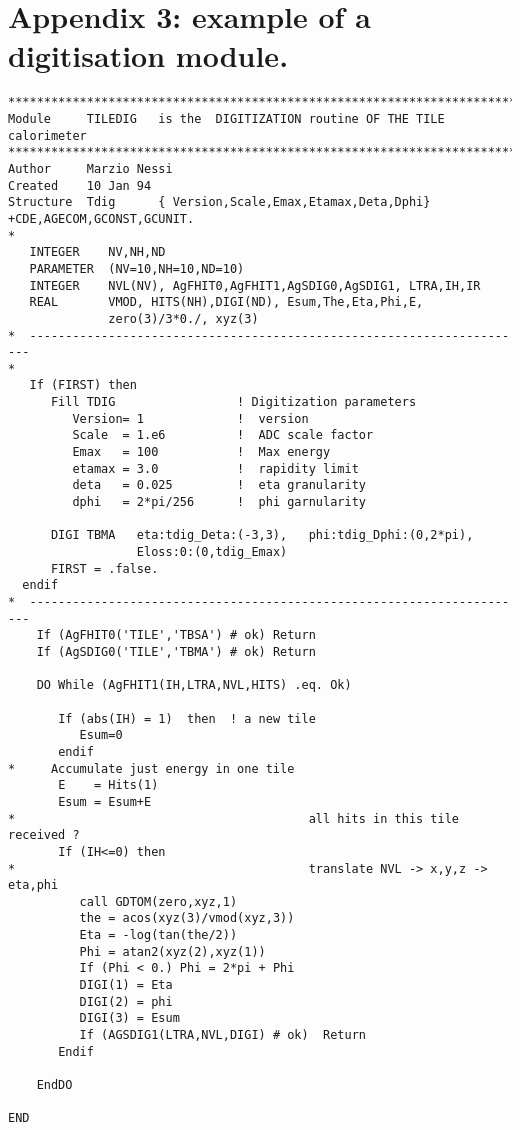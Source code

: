\section*{Appendix 3: example of a digitisation module.}
\vspace{0.3cm}
\begin{verbatim}
*************************************************************************
Module     TILEDIG   is the  DIGITIZATION routine OF THE TILE calorimeter
*************************************************************************
Author     Marzio Nessi
Created    10 Jan 94
Structure  Tdig      { Version,Scale,Emax,Etamax,Deta,Dphi}
+CDE,AGECOM,GCONST,GCUNIT.
*
   INTEGER    NV,NH,ND
   PARAMETER  (NV=10,NH=10,ND=10)
   INTEGER    NVL(NV), AgFHIT0,AgFHIT1,AgSDIG0,AgSDIG1, LTRA,IH,IR
   REAL       VMOD, HITS(NH),DIGI(ND), Esum,The,Eta,Phi,E,
              zero(3)/3*0./, xyz(3)
*  ----------------------------------------------------------------------
*
   If (FIRST) then
      Fill TDIG                 ! Digitization parameters
         Version= 1             !  version
         Scale  = 1.e6          !  ADC scale factor
         Emax   = 100           !  Max energy
         etamax = 3.0           !  rapidity limit
         deta   = 0.025         !  eta granularity
         dphi   = 2*pi/256      !  phi garnularity

      DIGI TBMA   eta:tdig_Deta:(-3,3),   phi:tdig_Dphi:(0,2*pi),
                  Eloss:0:(0,tdig_Emax)
      FIRST = .false.
  endif
*  ----------------------------------------------------------------------
    If (AgFHIT0('TILE','TBSA') # ok) Return
    If (AgSDIG0('TILE','TBMA') # ok) Return

    DO While (AgFHIT1(IH,LTRA,NVL,HITS) .eq. Ok)

       If (abs(IH) = 1)  then  ! a new tile
          Esum=0
       endif
*     Accumulate just energy in one tile
       E    = Hits(1)
       Esum = Esum+E
*                                         all hits in this tile received ?
       If (IH<=0) then
*                                         translate NVL -> x,y,z -> eta,phi
          call GDTOM(zero,xyz,1)
          the = acos(xyz(3)/vmod(xyz,3))
          Eta = -log(tan(the/2))
          Phi = atan2(xyz(2),xyz(1))
          If (Phi < 0.) Phi = 2*pi + Phi
          DIGI(1) = Eta
          DIGI(2) = phi
          DIGI(3) = Esum
          If (AGSDIG1(LTRA,NVL,DIGI) # ok)  Return
       Endif

    EndDO

END
\end{verbatim}





